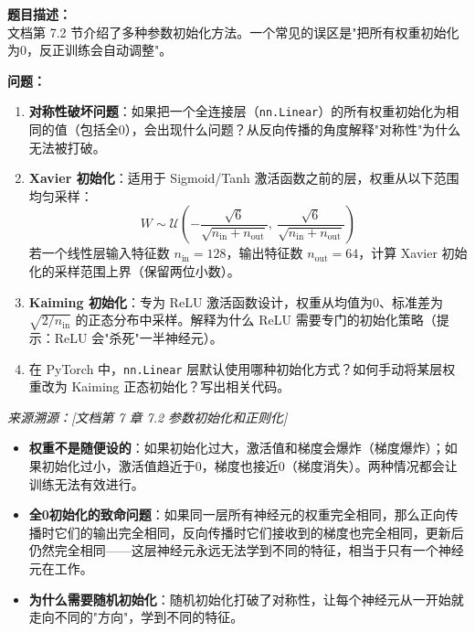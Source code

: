 \documentclass[a4paper,11pt]{ctexart}
\begin{document}
\begin{problembox}
    \textbf{题目描述：}\\
    文档第 7.2 节介绍了多种参数初始化方法。一个常见的误区是"把所有权重初始化为0，反正训练会自动调整"。

    \vspace{0.3cm}
    \textbf{问题：}
    \begin{enumerate}[(1)]
        \item \textbf{对称性破坏问题}：如果把一个全连接层（\texttt{nn.Linear}）的所有权重初始化为相同的值（包括全0），会出现什么问题？从反向传播的角度解释"对称性"为什么无法被打破。

        \item \textbf{Xavier 初始化}：适用于 Sigmoid/Tanh 激活函数之前的层，权重从以下范围均匀采样：
        \[
        W \sim \mathcal{U}\!\left(-\frac{\sqrt{6}}{\sqrt{n_{\text{in}}+n_{\text{out}}}},\ \frac{\sqrt{6}}{\sqrt{n_{\text{in}}+n_{\text{out}}}}\right)
        \]
        若一个线性层输入特征数 $n_{\text{in}}=128$，输出特征数 $n_{\text{out}}=64$，计算 Xavier 初始化的采样范围上界（保留两位小数）。

        \item \textbf{Kaiming 初始化}：专为 ReLU 激活函数设计，权重从均值为0、标准差为 $\sqrt{2/n_{\text{in}}}$ 的正态分布中采样。解释为什么 ReLU 需要专门的初始化策略（提示：ReLU 会"杀死"一半神经元）。

        \item 在 PyTorch 中，\texttt{nn.Linear} 层默认使用哪种初始化方式？如何手动将某层权重改为 Kaiming 正态初始化？写出相关代码。
    \end{enumerate}

    \vspace{0.2cm}
    {\color{gray}\small\textit{来源溯源：[文档第 7 章 7.2 参数初始化和正则化]}}
\end{problembox}

\begin{beginnerbox}
    \begin{itemize}
        \item \textbf{权重不是随便设的}：如果初始化过大，激活值和梯度会爆炸（梯度爆炸）；如果初始化过小，激活值趋近于0，梯度也接近0（梯度消失）。两种情况都会让训练无法有效进行。
        \item \textbf{全0初始化的致命问题}：如果同一层所有神经元的权重完全相同，那么正向传播时它们的输出完全相同，反向传播时它们接收到的梯度也完全相同，更新后仍然完全相同——这层神经元永远无法学到不同的特征，相当于只有一个神经元在工作。
        \item \textbf{为什么需要随机初始化}：随机初始化打破了对称性，让每个神经元从一开始就走向不同的"方向"，学到不同的特征。
    \end{itemize}
\end{beginnerbox}
\end{document}

